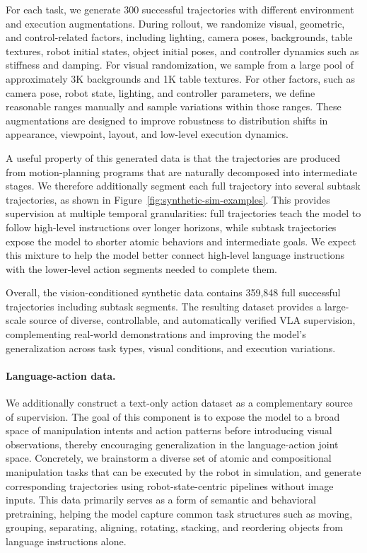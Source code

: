 \documentclass{llmxive}
\begin{document}
For each task, we generate 300 successful trajectories with different environment and execution augmentations. During rollout, we randomize visual, geometric, and control-related factors, including lighting, camera poses, backgrounds, table textures, robot initial states, object initial poses, and controller dynamics such as stiffness and damping. For visual randomization, we sample from a large pool of approximately 3K backgrounds and 1K table textures. For other factors, such as camera pose, robot state, lighting, and controller parameters, we define reasonable ranges manually and sample variations within those ranges. These augmentations are designed to improve robustness to distribution shifts in appearance, viewpoint, layout, and low-level execution dynamics.

A useful property of this generated data is that the trajectories are produced from motion-planning programs that are naturally decomposed into intermediate stages. We therefore additionally segment each full trajectory into several subtask trajectories, as shown in Figure~\ref{fig:synthetic-sim-examples}. This provides supervision at multiple temporal granularities: full trajectories teach the model to follow high-level instructions over longer horizons, while subtask trajectories expose the model to shorter atomic behaviors and intermediate goals. We expect this mixture to help the model better connect high-level language instructions with the lower-level action segments needed to complete them.

Overall, the vision-conditioned synthetic data contains 359,848 full successful trajectories including subtask segments. The resulting dataset provides a large-scale source of diverse, controllable, and automatically verified VLA supervision, complementing real-world demonstrations and improving the model's generalization across task types, visual conditions, and execution variations.

\paragraph{Language-action data.}
We additionally construct a text-only action dataset as a complementary source of supervision. The goal of this component is to expose the model to a broad space of manipulation intents and action patterns before introducing visual observations, thereby encouraging generalization in the language-action joint space. Concretely, we brainstorm a diverse set of atomic and compositional manipulation tasks that can be executed by the robot in simulation, and generate corresponding trajectories using robot-state-centric pipelines without image inputs. This data primarily serves as a form of semantic and behavioral pretraining, helping the model capture common task structures such as moving, grouping, separating, aligning, rotating, stacking, and reordering objects from language instructions alone.
\end{document}
